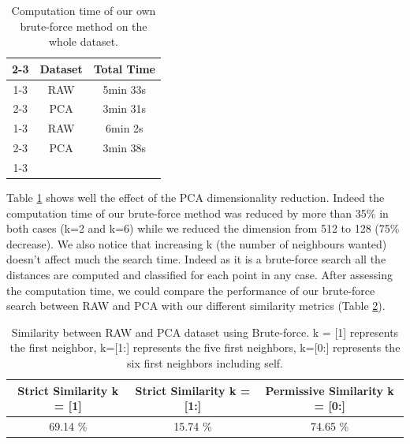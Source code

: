 \documentclass[a4paper]{article}
\begin{document}
	\begin{table}[h]
		\centering
		\begin{tabular}{ c | c | c |}
			\cline{2-3}
			& Dataset & Total Time \\ \cline{1-3}
			\multicolumn{1}{ |c|  }{\multirow{2}{*}{k=2} } & RAW & 5min 33s  \\ \cline{2-3}
			\multicolumn{1}{ |c|  }{} & PCA & 3min 31s  \\ \cline{1-3}
			\multicolumn{1}{ |c|  }{\multirow{2}{*}{k=6} } & RAW & 6min 2s \\ \cline{2-3}
			\multicolumn{1}{ |c|  }{} & PCA & 3min 38s \\ \cline{1-3}
		\end{tabular}
		\caption{Computation time of our own brute-force method on the whole dataset.}
		\label{table:benchmark-bruteforce}
	\end{table}
	
	Table \ref{table:benchmark-bruteforce} shows well the effect of the PCA dimensionality reduction. Indeed the computation time of our brute-force method was reduced by more than 35\% in both cases (k=2 and k=6) while we reduced the dimension from 512 to 128 (75\% decrease). We also notice that increasing k (the number of neighbours wanted) doesn't affect much the search time. Indeed as it is a brute-force search all the distances are computed and classified for each point in any case. After assessing the computation time, we could compare the performance of our brute-force search between RAW and PCA with our different similarity metrics (Table \ref{table:sim-bruteforce}).
	
	\begin{table}[h]
		\centering
		\begin{tabular}{ | c | c | c |}
		\hline
			Strict Similarity k = [1] & Strict Similarity k = [1:] & Permissive Similarity k = [0:] \\ \hline
			69.14 \% & 15.74 \% & 74.65 \% \\ \hline
			
		\end{tabular}
		\caption{Similarity between RAW and PCA dataset using Brute-force. k = [1] represents the first neighbor, k=[1:] represents the five first neighbors, k=[0:] represents the six first neighbors including self.}
		\label{table:sim-bruteforce}
	\end{table}
	
\end{document}
